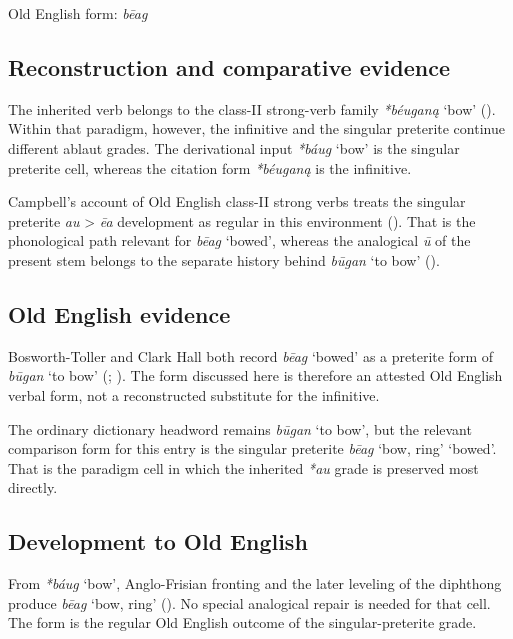 \documentclass[
  british,
  a4paper,
  openany]{book}
\providecommand{\Recon}[1]{\emph{*#1}}
{\catcode`→=\active \global\def→{\ensuremath{\rightarrow}}}
\providecommand{\Recon}[1]{\emph{*#1}}
{\catcode`→=\active \global\def→{\ensuremath{\rightarrow}}}
\begin{document}
Old English form: \emph{bēag}

\subsection{Reconstruction and comparative
evidence}\label{reconstruction-and-comparative-evidence-110}

The inherited verb belongs to the class-II strong-verb family
{\Recon{béuganą} `bow'} (). Within that paradigm, however, the infinitive and the
singular preterite continue different ablaut grades. The derivational
input {\Recon{báug} `bow'} is the singular preterite cell, whereas the
citation form {\Recon{béuganą}} is the infinitive.

Campbell's account of Old English class-II strong verbs treats the
singular preterite \emph{au} \textgreater{} \emph{ēa} development as
regular in this environment (). That is the phonological path relevant for {\emph{bēag}} `bowed',
whereas the analogical \emph{ū} of the present stem belongs to the
separate history behind {\emph{būgan}} `to bow'
().

\subsection{Old English evidence}\label{old-english-evidence-110}

Bosworth-Toller and Clark Hall both record {\emph{bēag}} `bowed' as a
preterite form of {\emph{būgan}} `to bow'
(;
). The form discussed
here is therefore an attested Old English verbal form, not a
reconstructed substitute for the infinitive.

The ordinary dictionary headword remains {\emph{būgan}} `to bow', but
the relevant comparison form for this entry is the singular preterite
{\emph{bēag}} `bow, ring' `bowed'. That is the paradigm cell in which
the inherited \emph{*au} grade is preserved most directly.

\subsection{Development to Old
English}\label{development-to-old-english-110}

From {\Recon{báug} `bow'}, Anglo-Frisian fronting and the later leveling
of the diphthong produce {\emph{bēag}} `bow, ring'
(). No special analogical
repair is needed for that cell. The form is the regular Old English
outcome of the singular-preterite grade.
\end{document}
